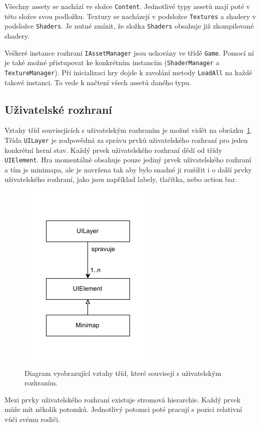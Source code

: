 Všechny assety se nachází ve složce \texttt{Content}. Jednotlivé typy assetů mají poté v této složce svou podložku. Textury se nacházejí v podsložce \texttt{Textures} a shadery v podsložce \texttt{Shaders}. Je nutné zmínit, že složka \texttt{Shaders} obsahuje již zkompilované shadery.

Veškeré instance rozhraní \texttt{IAssetManager} jsou uchovány ve třídě \texttt{Game}. Pomocí ní je také možné přistupovat ke konkrétním instancím (\texttt{ShaderManager} a \texttt{TextureManager}). Při inicializaci hry dojde k zavolání metody \texttt{LoadAll} na každé takové instanci. To vede k načtení všech assetů daného typu.

\subsection{Uživatelské rozhraní}
Vztahy tříd souvisejících s uživatelským rozhraním je možné vidět na obrázku~\ref{fig:ui-layer}. Třída \texttt{UILayer} je zodpovědná za správu prvků uživatelského rozhraní pro jeden konkrétní herní stav. Každý prvek uživatelského rozhraní dědí od třídy \texttt{UIElement}. Hra momentálně obsahuje pouze jediný prvek uživatelského rozhraní a tím je minimapa, ale je navržena tak aby bylo snadné ji rozšířit i o další prvky uživatelského rozhraní, jako jsou například labely, tlačítka, nebo action bar.

\begin{figure}[!htb]
  \centering
  \includegraphics[width=0.4\linewidth]{img/ui-layer.pdf}
  \caption{Diagram vyobrazující vztahy tříd, které souvisejí s uživatelským rozhraním.}
  \label{fig:ui-layer}
\end{figure}

Mezi prvky uživatelského rozhraní existuje stromová hierarchie. Každý prvek může mít několik potomků. Jednotlivý potomci poté pracují s pozici relativní vůči svému rodiči.

